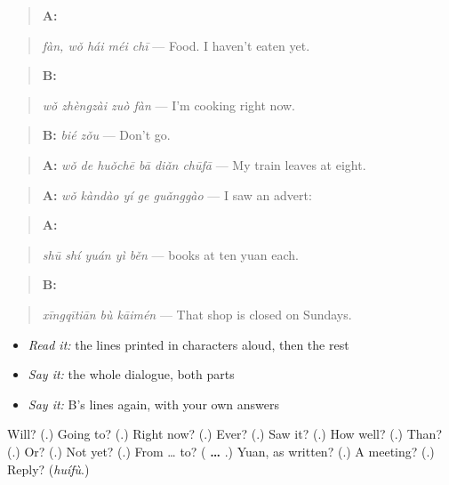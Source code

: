 \begin{quote}
\textbf{A:}  
\end{quote}

\begin{quote}
\emph{fàn, wǒ hái méi chī} — Food. I haven't eaten yet.
\end{quote}

\begin{quote}
\textbf{B:} 
\end{quote}

\begin{quote}
\emph{wǒ zhèngzài zuò fàn} — I'm cooking right now.
\end{quote}

\begin{quote}
\textbf{B:} \emph{bié zǒu} — Don't go.
\end{quote}

\begin{quote}
\textbf{A:} \emph{wǒ de huǒchē bā diǎn chūfā} — My train leaves at eight.
\end{quote}

\begin{quote}
\textbf{A:} \emph{wǒ kàndào yí ge guǎnggào} — I saw an advert:
\end{quote}

\begin{quote}
\textbf{A:} 
\end{quote}

\begin{quote}
\emph{shū shí yuán yì běn} — books at ten yuan each.
\end{quote}

\begin{quote}
\textbf{B:} 
\end{quote}

\begin{quote}
\emph{xīngqītiān bù kāimén} — That shop is closed on Sundays.
\end{quote}

\begin{itemize}
\raggedright
  \item \emph{Read it:} the lines printed in characters aloud, then the rest
  \item \emph{Say it:} the whole dialogue, both parts
  \item \emph{Say it:} B's lines again, with your own answers
\end{itemize}

\begin{tcolorbox}[breakable,colback=teal!4,colframe=teal!35!black,title={Before you move on}]
Will? (\textbf{}.) Going to? (\textbf{}.) Right now? (\textbf{}.) Ever? (\textbf{}.) Saw it? (\textbf{}.) How well? (\textbf{}.) Than? (\textbf{}.) Or? (\textbf{}.) Not yet? (\textbf{}.) From … to? (\textbf{ … }.) Yuan, as written? (\textbf{}.) A meeting? (\textbf{}.) Reply? (\emph{huífù}.)
\end{tcolorbox}
